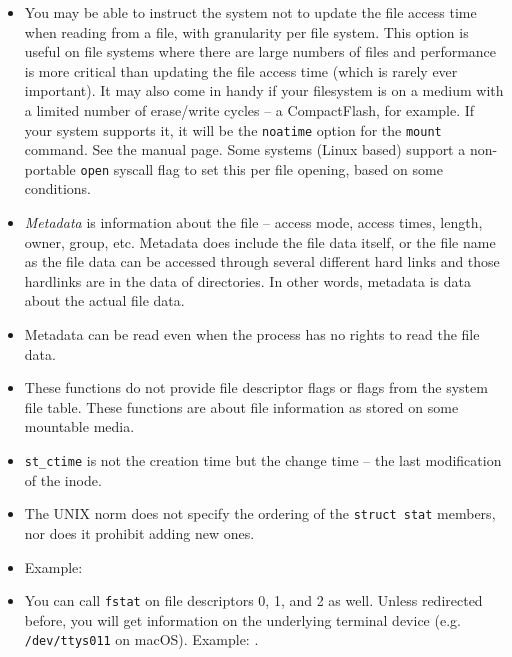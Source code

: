 \begin{itemize}
\item You may be able to instruct the system not to update the file access time
when reading from a file, with granularity per file system.  This option is
useful on file systems where there are large numbers of files and performance is
more critical than updating the file access time (which is rarely ever
important).  It may also come in handy if your filesystem is on a medium with a
limited number of erase/write cycles -- a CompactFlash, for example.  If your
system supports it, it will be the \texttt{noatime} option for the \texttt{mount}
command.  See the manual page. Some systems (Linux based) support a non-portable
\texttt{open} syscall flag to set this per file opening, based on some
conditions.
\item \emph{Metadata} is information about the file -- access mode, access
times, length, owner, group, etc.  Metadata does  include the file
data itself, or the file name as the file data can be accessed through
several different hard links and those hardlinks are in the data of directories.
In other words, metadata is data about the actual file data.
\item Metadata can be read even when the process has no rights to read the file
data.
\item These functions do not provide file descriptor flags or flags from the
system file table. These functions are about file information as stored on some
mountable media.
\item \texttt{st\_ctime} is not the creation time but the change time -- the
last modification of the inode.
\item The UNIX norm does not specify the ordering of the \texttt{struct stat}
members, nor does it prohibit adding new ones.
\item {} Example: 
\item You can call \texttt{fstat} on file descriptors 0, 1, and 2 as well.  Unless
redirected before, you will get information on the underlying terminal device
(e.g. \texttt{/dev/ttys011} on macOS).  Example: .
\end{itemize}




